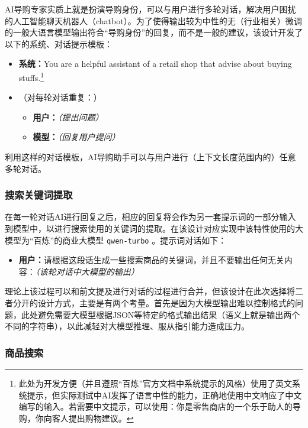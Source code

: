 AI导购专家实质上就是扮演导购身份，可以与用户进行多轮对话，解决用户困扰的人工智能聊天机器人（chatbot）。为了使得输出较为中性的无（行业相关）微调的一般大语言模型输出符合“导购身份”的回复，而不是一般的建议，该设计开发了以下的系统、对话提示模板：

\begin{itemize}
    \item[] \textbf{系统：}You are a helpful assistant of a retail shop that advise about buying stuffs.\footnote{此处为开发方便（并且遵照“百炼”官方文档中系统提示的风格）使用了英文系统提示，但实际测试中AI发挥了语言中性的能力，正确地使用中文响应了中文编写的输入。若需要中文提示，可以使用：你是零售商店的一个乐于助人的导购，你向客人提出购物建议。}
    \item[] （对每轮对话重复：）
    \begin{itemize}
        \item[] \textbf{用户：}\textit{（提出问题）}
        \item[] \textbf{模型：}\textit{（回复用户提问）}
    \end{itemize}
\end{itemize}

利用这样的对话模板，AI导购助手可以与用户进行（上下文长度范围内的）任意多轮对话。

\subsubsection{搜索关键词提取}

在每一轮对话AI进行回复之后，相应的回复将会作为另一套提示词的一部分输入到模型中，以进行搜索使用的关键词的提取。在该设计对应实现中该特性使用的大模型为“百炼”的商业大模型 \verb|qwen-turbo| 。提示词对话如下：

\begin{itemize}
    \item[] \textbf{用户：}请根据这段话生成一些搜索商品的关键词，并且不要输出任何无关内容：\textit{（该轮对话中大模型的输出）}
\end{itemize}

理论上该过程可以和前文提及进行对话的过程进行合并，但该设计在此次选择将二者分开的设计方式，主要是有两个考量。首先是因为大模型输出难以控制格式的问题，此处避免需要大模型根据JSON等特定的格式输出结果（语义上就是输出两个不同的字符串），以此减轻对大模型推理、服从指引能力造成压力。

\subsubsection{商品搜索}

